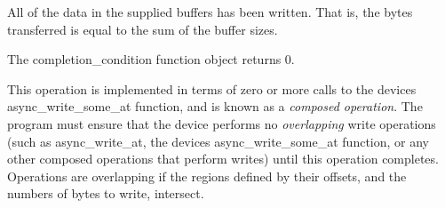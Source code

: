 \begin{DoxyItemize}
\item All of the data in the supplied buffers has been written. That is, the bytes transferred is equal to the sum of the buffer sizes.\end{DoxyItemize}
\begin{DoxyItemize}
\item The completion\+\_\+condition function object returns 0.\end{DoxyItemize}
This operation is implemented in terms of zero or more calls to the device\textquotesingle{}s async\+\_\+write\+\_\+some\+\_\+at function, and is known as a {\itshape composed operation}. The program must ensure that the device performs no {\itshape overlapping} write operations (such as async\+\_\+write\+\_\+at, the device\textquotesingle{}s async\+\_\+write\+\_\+some\+\_\+at function, or any other composed operations that perform writes) until this operation completes. Operations are overlapping if the regions defined by their offsets, and the numbers of bytes to write, intersect.


